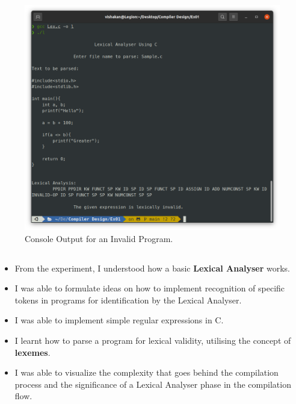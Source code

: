 \documentclass[12pt, a4]{article}
\begin{document}
\newpage
\subsection*{}
\begin{figure}[h]
\centering
\caption{Console Output for an Invalid Program.}
\includegraphics[scale= 0.5]{invalid_example.png}
\end{figure}

\newpage
\subsection*{}
\begin{itemize}

\item From the experiment, I understood how a basic \textbf{Lexical Analyser} works.
\item I was able to formulate ideas on how to implement recognition of specific tokens in programs for identification by the Lexical Analyser. 
\item I was able to implement simple regular expressions in C.
\item I learnt how to parse a program for lexical validity, utilising the concept of \textbf{lexemes}.
\item I was able to visualize the complexity that goes behind the compilation process and the significance of a Lexical Analyser phase in the compilation flow.

\end{itemize}
\end{document}
